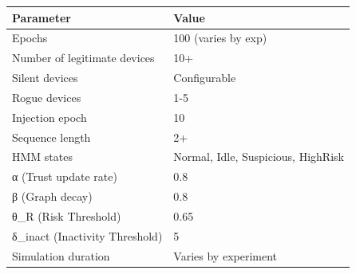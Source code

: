 \begin{tabular}{ll}
\toprule
Parameter & Value \\
\midrule
Epochs & 100 (varies by exp) \\
Number of legitimate devices & 10+ \\
Silent devices & Configurable \\
Rogue devices & 1-5 \\
Injection epoch & 10 \\
Sequence length & 2+ \\
HMM states & Normal, Idle, Suspicious, HighRisk \\
α (Trust update rate) & 0.8 \\
β (Graph decay) & 0.8 \\
θ_R (Risk Threshold) & 0.65 \\
δ_inact (Inactivity Threshold) & 5 \\
Simulation duration & Varies by experiment \\
\bottomrule
\end{tabular}
